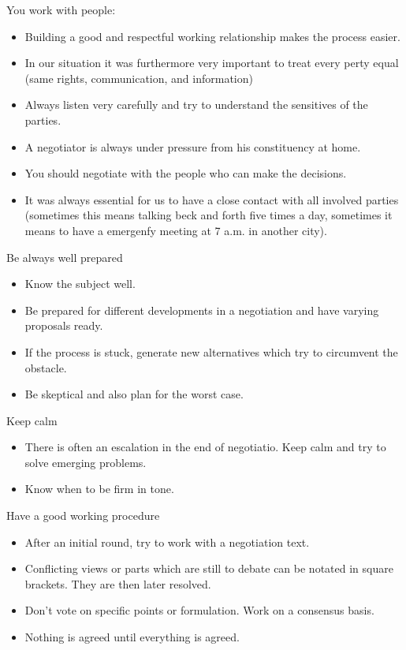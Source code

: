 You work with people:
\begin{itemize}
    \item Building a good and respectful working relationship makes the process easier.
    \item In our situation it was furthermore very important to treat every perty equal
        (same rights, communication, and information)
    \item Always listen very carefully and try to understand the sensitives of the parties.
    \item A negotiator is always under pressure from his constituency at home.
    \item You should negotiate with the people who can make the decisions.
    \item It was always essential for us to have a close contact with all involved parties
        (sometimes this means talking beck and forth five times a day, sometimes it means
        to have a emergenfy meeting at 7 a.m. in another city).
\end{itemize}
Be always well prepared
\begin{itemize}
    \item Know the subject well.
    \item Be prepared for different developments in a negotiation and have
        varying proposals ready.
    \item If the process is stuck, generate new alternatives which try to
        circumvent the obstacle.
    \item Be skeptical and also plan for the worst case.
\end{itemize}
Keep calm
\begin{itemize}
    \item There is often an escalation in the end of negotiatio. Keep calm
        and try to solve emerging problems.
    \item Know when to be firm in tone.
\end{itemize}
Have a good working procedure
\begin{itemize}
    \item After an initial round, try to work with a negotiation text.
    \item Conflicting views or parts which are still to debate can be notated
        in square brackets. They are then later resolved.
    \item Don't vote on specific points or formulation. Work on a consensus basis.
    \item Nothing is agreed until everything is agreed.
\end{itemize}

